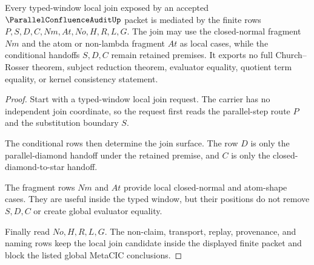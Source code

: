 \begin{theorem}
\label{thm:parallel-confluence-audit-typed-window-local-join}
Every typed-window local join exposed by an accepted $\ParallelConfluenceAuditUp$ packet is mediated by the finite rows $P,S,D,C,Nm,At,No,H,R,L,G$. The join may use the closed-normal fragment $Nm$ and the atom or non-lambda fragment $At$ as local cases, while the conditional handoffs $S,D,C$ remain retained premises. It exports no full Church--Rosser theorem, subject reduction theorem, evaluator equality, quotient term equality, or kernel consistency statement.
\end{theorem}
\begin{proof}
Start with a typed-window local join request. The carrier has no independent join coordinate, so the request first reads the parallel-step route $P$ and the substitution boundary $S$.

The conditional rows then determine the join surface. The row $D$ is only the parallel-diamond handoff under the retained premise, and $C$ is only the closed-diamond-to-star handoff.

The fragment rows $Nm$ and $At$ provide local closed-normal and atom-shape cases. They are useful inside the typed window, but their positions do not remove $S,D,C$ or create global evaluator equality.

Finally read $No,H,R,L,G$. The non-claim, transport, replay, provenance, and naming rows keep the local join candidate inside the displayed finite packet and block the listed global MetaCIC conclusions.
\end{proof}

